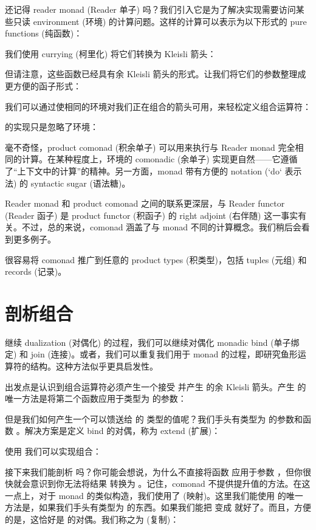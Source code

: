 还记得 reader monad (Reader 单子) 吗？我们引入它是为了解决实现需要访问某些只读 environment (环境)  的计算问题。这样的计算可以表示为以下形式的 pure functions (纯函数)：

我们使用 currying (柯里化) 将它们转换为 Kleisli 箭头：

但请注意，这些函数已经具有余 Kleisli 箭头的形式。让我们将它们的参数整理成更方便的函子形式：

我们可以通过使相同的环境对我们正在组合的箭头可用，来轻松定义组合运算符：

 的实现只是忽略了环境：

毫不奇怪，product comonad (积余单子) 可以用来执行与 Reader monad 完全相同的计算。在某种程度上，环境的 comonadic (余单子) 实现更自然——它遵循了“上下文中的计算”的精神。另一方面，monad 带有方便的  notation (`do` 表示法) 的 syntactic sugar (语法糖)。

Reader monad 和 product comonad 之间的联系更深层，与 Reader functor (Reader 函子) 是 product functor (积函子) 的 right adjoint (右伴随) 这一事实有关。不过，总的来说，comonad 涵盖了与 monad 不同的计算概念。我们稍后会看到更多例子。

很容易将  comonad 推广到任意的 product types (积类型)，包括 tuples (元组) 和 records (记录)。

\section{剖析组合}

继续 dualization (对偶化) 的过程，我们可以继续对偶化 monadic bind (单子绑定) 和 join (连接)。或者，我们可以重复我们用于 monad 的过程，即研究鱼形运算符的结构。这种方法似乎更具启发性。

出发点是认识到组合运算符必须产生一个接受  并产生  的余 Kleisli 箭头。产生  的唯一方法是将第二个函数应用于类型为  的参数：

但是我们如何产生一个可以馈送给  的  类型的值呢？我们手头有类型为  的参数和函数 。解决方案是定义 bind 的对偶，称为 extend (扩展)：

使用  我们可以实现组合：

接下来我们能剖析  吗？你可能会想说，为什么不直接将函数  应用于参数 ，但你很快就会意识到你无法将结果  转换为 。记住，comonad 不提供提升值的方法。在这一点上，对于 monad 的类似构造，我们使用了  (映射)。这里我们能使用  的唯一方法是，如果我们手头有类型为  的东西。如果我们能把  变成  就好了。而且，方便的是，这恰好是  的对偶。我们称之为  (复制)：

